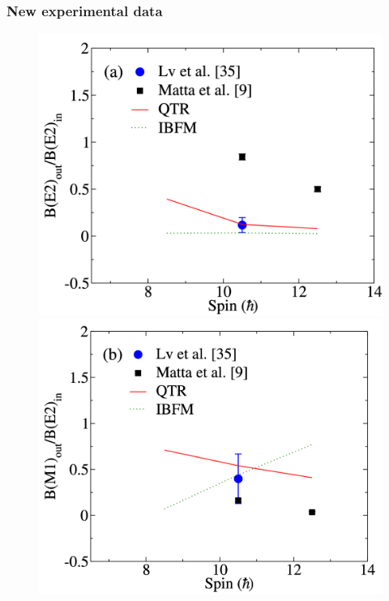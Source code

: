 \documentclass{beamer}
\begin{document}
\begin{frame}
	\frametitle{New experimental data}

	\begin{figure}
		\centering
		\includegraphics[scale=0.13]{figures/new-DATA-1.pdf}
		\includegraphics[scale=0.13]{figures/new-DATA-2.pdf}

\end{figure}
\end{frame}
\end{document}

